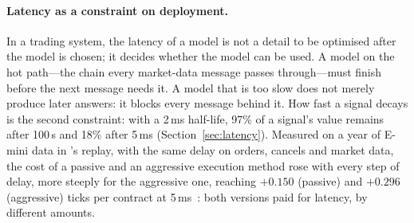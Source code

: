 \paragraph{Latency as a constraint on deployment.} In a trading system, the latency of a model is not a
detail to be optimised after the model is chosen; it decides whether the model can be used. A model on the hot
path---the chain every market-data message passes through---must finish before the next message needs it. A model
that is too slow does not merely produce later answers: it blocks every message behind it.
How fast a signal decays is the second constraint: with a 2\,ms half-life, 97\% of a signal's value remains after
100\,\textmu s and 18\% after 5\,ms (Section~\ref{sec:latency}). Measured on a year of E-mini data in \kasparhft{}'s
replay, with the same delay on orders, cancels and market data, the cost of a passive and an aggressive execution
method rose with every step of delay, more steeply for the aggressive one, reaching $+0.150$ (passive) and $+0.296$
(aggressive) ticks per contract at 5\,ms~\citep{maciejewski_shadow}: both versions paid for latency, by different
amounts.

